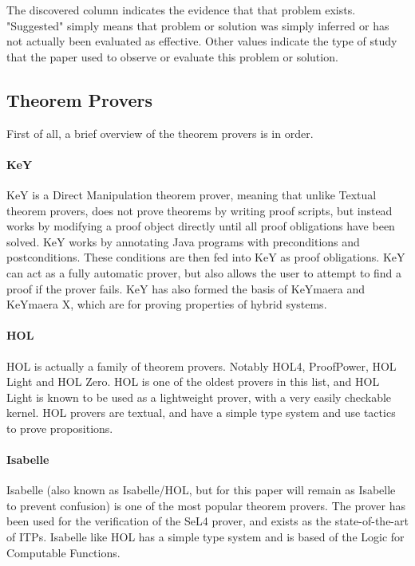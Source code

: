 \documentclass[
]{article}
\begin{document}
The discovered column indicates the evidence that that problem exists.
"Suggested" simply means that problem or solution was simply inferred or
has not actually been evaluated as effective. Other values indicate the
type of study that the paper used to observe or evaluate this problem or
solution.

\hypertarget{theorem-provers}{%
\subsection{Theorem Provers}\label{theorem-provers}}

First of all, a brief overview of the theorem provers is in order.

\hypertarget{key}{%
\paragraph{KeY}\label{key}}

KeY is a Direct Manipulation theorem prover, meaning that unlike Textual
theorem provers, does not prove theorems by writing proof scripts, but
instead works by modifying a proof object directly until all proof
obligations have been solved. KeY works by annotating Java programs with
preconditions and postconditions. These conditions are then fed into KeY
as proof obligations. KeY can act as a fully automatic prover, but also
allows the user to attempt to find a proof if the prover fails. KeY has
also formed the basis of KeYmaera and KeYmaera X, which are for proving
properties of hybrid systems.

\hypertarget{hol}{%
\paragraph{HOL}\label{hol}}

HOL is actually a family of theorem provers. Notably HOL4, ProofPower,
HOL Light and HOL Zero. HOL is one of the oldest provers in this list,
and HOL Light is known to be used as a lightweight prover, with a very
easily checkable kernel. HOL provers are textual, and have a simple type
system and use tactics to prove propositions.

\hypertarget{isabelle}{%
\paragraph{Isabelle}\label{isabelle}}

Isabelle (also known as Isabelle/HOL, but for this paper will remain as
Isabelle to prevent confusion) is one of the most popular theorem
provers. The prover has been used for the verification of the SeL4
prover, and exists as the state-of-the-art of ITPs. Isabelle like HOL
has a simple type system and is based of the Logic for Computable
Functions.
\end{document}

